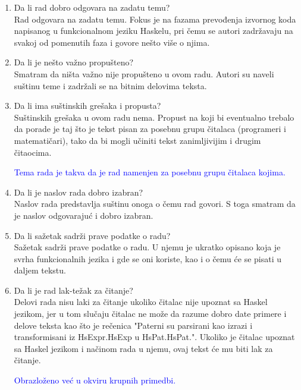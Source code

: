 \documentclass[a4paper]{report}
\newcommand{\odgovor}[1]{\textcolor{blue}{#1}}
\begin{document}
	\begin{enumerate}
		\item Da li rad dobro odgovara na zadatu temu?\\
		Rad odgovara na zadatu temu. Fokus je na fazama prevođenja izvornog koda napisanog u funkcionalnom jeziku Haskelu, pri čemu se autori zadržavaju na svakoj od pomenutih faza i govore nešto više o njima.
		\item Da li je nešto važno propušteno?\\
		Smatram da ništa važno nije propušteno u ovom radu. Autori su naveli suštinu teme i zadržali se na bitnim delovima teksta.
		\item Da li ima suštinskih grešaka i propusta?\\
		Suštinskih grešaka u ovom radu nema. Propust na koji bi eventualno trebalo da porade je taj što je tekst pisan za posebnu grupu čitalaca (programeri i matematičari), tako da bi mogli učiniti tekst zanimljivijim i drugim čitaocima.
		
		\odgovor{Tema rada je takva da je rad namenjen za posebnu grupu čitalaca kojima.}
		
		\item Da li je naslov rada dobro izabran?\\
		Naslov rada predstavlja suštinu onoga o čemu rad govori. S toga smatram da je naslov odgovarajuć i dobro izabran.
		\item Da li sažetak sadrži prave podatke o radu?\\
		Sažetak sadrži prave podatke o radu. U njemu je ukratko opisano koja je svrha funkcionalnih jezika i gde se oni koriste, kao i o čemu će se pisati u daljem tekstu.
		\item Da li je rad lak-težak za čitanje?\\
		Delovi rada nisu laki za čitanje ukoliko čitalac nije upoznat sa Haskel jezikom, jer u tom slučaju čitalac ne može da razume dobro date primere i delove teksta kao što je rečenica "Paterni su parsirani kao izrazi i transformisani iz HsExpr.HsExp u
		HsPat.HsPat.". Ukoliko je čitalac upoznat sa Haskel jezikom i načinom rada u njemu, ovaj tekst će mu biti lak za čitanje.
		
		\odgovor{Obrazloženo već u okviru krupnih primedbi.}
		

\end{enumerate}
\end{document}
